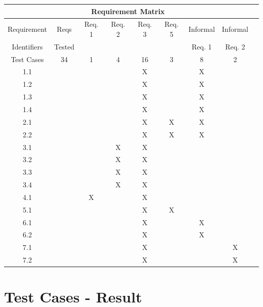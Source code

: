 \documentclass[a4paper, 12pt]{article}
\begin{document}
\begin{tabular}{|c|c|c|c|c|c|c|c|c|}
\hline
\multicolumn{8}{|c|}{Requirement Matrix} \\ \hline
Requirement	& Reqs		& Req. 1	& 	Req. 2	&  Req. 3	& Req. 5 	& Informal	& Informal	\\ 
Identifiers		& Tested	&				&				& 				&				&	Req. 1	&	Req. 2	\\ \hline
Test Cases	&	34			&	1			&	4			&	16			&	3			&	8			&	2			\\ \hline
1.1				& 				&				&				&	X			&				&	X			&				\\ \hline
1.2				& 				&				&				&	X			&				&	X			&				\\ \hline
1.3 				& 				&				&				&	X			&				&	X			&				\\ \hline
1.4				&				&				&				&  X			&				&	X			&				\\ \hline
2.1				&				& 				& 				&	X			&	X			&	X			&				\\ \hline
2.2				&				&				& 				&	X			&	X			&	X			&				\\ \hline
3.1				&				&				& X			&	X			&				&				&				\\ \hline
3.2				&				&				& X			&	X			&				&				&				\\ \hline
3.3				&				&				& X			&	X			&				&				&				\\ \hline
3.4				&				&				& X			&	X			&				&				&				\\ \hline
4.1				& 				&	X			& 				&	X			&				&				&				\\ \hline
5.1				&				&				&				&	X			&	X			&				&				\\ \hline
6.1				&				&				&				&	X			&				&	X			&				\\ \hline
6.2				&				&				&				&	X			&				&	X			&				\\ \hline
7.1				&				&				&				&	X			&				&				& X			\\ \hline
7.2				&				&				&				&  X			&				&				& X			\\ \hline

\end{tabular}



\section{Test Cases - Result}
\end{document}
